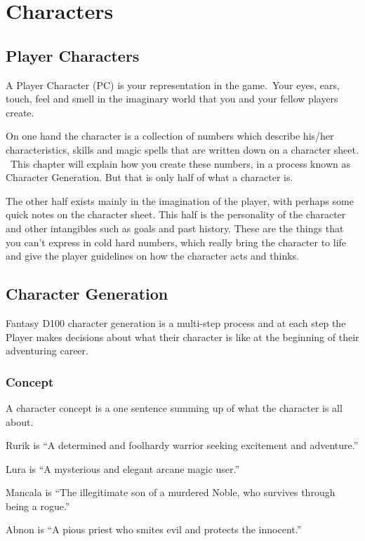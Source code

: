 \chapter{Characters}
\label{ch:characters}

\section{Player Characters}
A Player Character (PC) is your representation in the game. Your eyes, ears, touch, feel and smell in the imaginary world that you and your fellow players create.

On one hand the character is a collection of numbers which describe his/her characteristics, skills and magic spells that are written down on a character sheet.  This chapter will explain how you create these numbers, in a process known as Character Generation. But that is only half of what a character is.

The other half exists mainly in the imagination of the player, with perhaps some quick notes on the character sheet. This half is the personality of the character and other intangibles such as goals and past history. These are the things that you can’t express in cold hard numbers, which really bring the character to life and give the player guidelines on how the character acts and thinks.


\section{Character Generation}
Fantasy D100 character generation is a multi-step process and at each step the Player makes decisions about what their character is like at the beginning of their adventuring career. 

\subsection{Concept}
A character concept is a one sentence summing up of what the character is all about.

\begin{rpg-examplebox}
\begin{rpg-list}
\item Rurik is ``A determined and foolhardy warrior seeking excitement and adventure.''
\item Lura is ``A mysterious and elegant arcane magic user.''
\item Mancala is ``The illegitimate son of a murdered Noble, who survives through being a rogue.''
\item Abnon is ``A pious priest who smites evil and protects the innocent.''
\end{rpg-list}
\end{rpg-examplebox}

